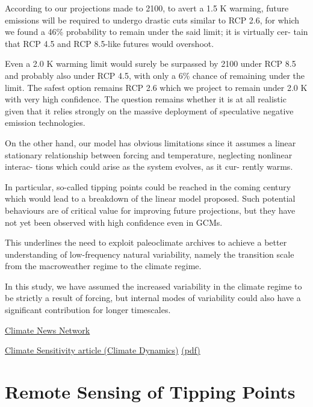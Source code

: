 \documentclass[
]{book}
\begin{document}
According to our projections made to 2100, to avert a 1.5
K warming, future emissions will be required to undergo
drastic cuts similar to RCP 2.6, for which we found a 46\%
probability to remain under the said limit; it is virtually cer-
tain that RCP 4.5 and RCP 8.5-like futures would overshoot.

Even a 2.0 K warming limit would surely be surpassed by
2100 under RCP 8.5 and probably also under RCP 4.5, with
only a 6\% chance of remaining under the limit. The safest
option remains RCP 2.6 which we project to remain under
2.0 K with very high confidence. The question remains
whether it is at all realistic given that it relies strongly on
the massive deployment of speculative negative emission
technologies.

On the other hand, our model has obvious limitations
since it assumes a linear stationary relationship between
forcing and temperature, neglecting nonlinear interac-
tions which could arise as the system evolves, as it cur-
rently warms.

In particular, so-called tipping points could
be reached in the coming century which would lead to a
breakdown of the linear model proposed. Such potential
behaviours are of critical value for improving future projections,
but they have not yet been observed with high confidence even in GCMs.

This underlines the need to exploit
paleoclimate archives to achieve a better understanding of
low-frequency natural variability, namely the transition scale
from the macroweather regime to the climate regime.

In this study, we have assumed the increased variability in the climate regime
to be strictly a result of forcing,
but internal modes of variability could also have a significant contribution
for longer timescales.

\href{https://climatenewsnetwork.net/seven-years-to-ground-zero-for-the-climate-crisis/}{Climate News Network}

\href{https://link.springer.com/article/10.1007/s00382-020-05521-x}{Climate Sensitivity article (Climate Dynamics)}
\href{pdf/Hebert_2020_Climate_Sensitivity_Estimates.pdf}{(pdf)}

\hypertarget{remote-sensing-of-tipping-points}{%
\section{Remote Sensing of Tipping Points}\label{remote-sensing-of-tipping-points}}
\end{document}
